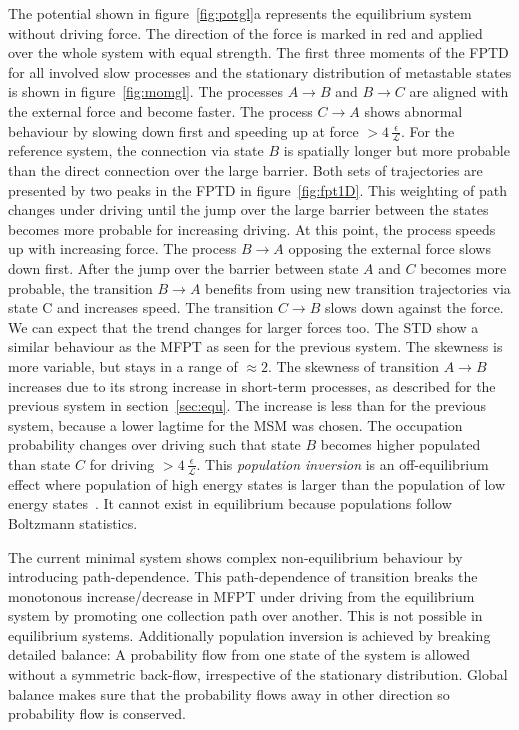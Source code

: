 The potential shown in figure~\ref{fig:potgl}a represents the equilibrium system without driving force.  The direction of the force is marked in red and applied over the whole system with equal strength. The first three moments of the FPTD for all involved slow processes and the stationary distribution of metastable states is shown in figure~\ref{fig:momgl}. The processes $A\rightarrow B$ and $B\rightarrow C$ are aligned with the external force and become faster. The process $C\rightarrow A$ shows abnormal behaviour by slowing down first and speeding up at force $> 4\,\frac{\epsilon}{\mathcal{L}}$. For the reference system, the connection via state $B$ is spatially longer but more probable than the direct connection over the large barrier. Both sets of trajectories are presented by two peaks in the FPTD in figure~\ref{fig:fpt1D}. This weighting of path changes under driving until the jump over the large barrier between the states becomes more probable for increasing driving. At this point, the process speeds up with increasing force. The process $B\rightarrow A$ opposing the external force slows down first. After the jump over the barrier between state $A$ and $C$ becomes more probable, the transition  $B\rightarrow A$ benefits from using new transition trajectories via state C and increases speed. The transition $C\rightarrow B$ slows down against the force. We can expect that the trend changes for larger forces too.  The STD show a similar behaviour as the MFPT as seen for the previous system. The skewness is more variable, but stays in a range of $\approx 2 $. The skewness of transition $A\rightarrow B$ increases due to its strong increase in short-term processes, as described for the previous system in section~\ref{sec:equ}. The increase is less than for the previous system, because a lower lagtime for the MSM was chosen. The occupation probability changes over driving such that state $B$ becomes higher populated than state $C$ for driving $> 4\,\frac{\epsilon}{\mathcal{L}}$. This \textit{population inversion} is an off-equilibrium effect where population of high energy states is larger than the population of low energy states~\cite{maes2018non}. It cannot exist in equilibrium because populations follow Boltzmann statistics. 

The current minimal system shows complex non-equilibrium behaviour by introducing path-dependence.  This path-dependence of transition breaks the monotonous increase/decrease in MFPT under driving from the equilibrium system by promoting one collection path over another. This is not possible in equilibrium systems. Additionally population inversion is achieved by breaking detailed balance: A probability flow from one state of the system is allowed without a symmetric back-flow, irrespective of the stationary distribution. Global balance makes sure that the probability flows away in other direction so probability flow is conserved. 

